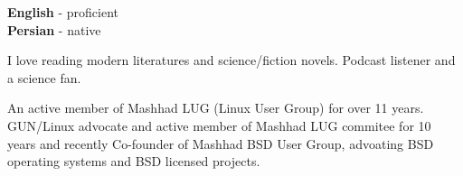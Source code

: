 \documentclass[12pt]{developercv}
\begin{document}
\begin{minipage}[t]{1.0\textwidth}
	\vspace{-\baselineskip} %


	\textbf{English} - proficient\\
	\textbf{Persian} - native\\
\end{minipage}
\hfill
\begin{minipage}[t]{1.0\textwidth}
	\vspace{-\baselineskip} %
	
	
	I love reading modern literatures and science/fiction novels. Podcast listener
	and a science fan.
	\\
\end{minipage}
\hfill
\begin{minipage}[t]{1.0\textwidth}
	\vspace{-\baselineskip} %
	
	
	An active member of Mashhad LUG (Linux User Group) for over 11 years.
	GUN/Linux advocate and active member of Mashhad LUG commitee
	for 10 years and recently Co-founder of Mashhad BSD User Group,
	advoating BSD operating systems and BSD licensed projects.

\end{minipage}

\end{document}
